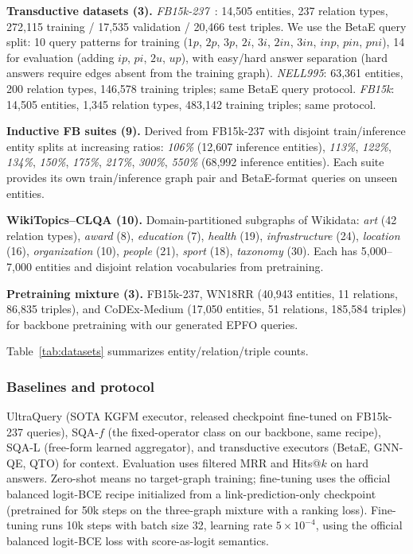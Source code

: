 \documentclass[journal]{IEEEtran}
\begin{document}
\textbf{Transductive datasets (3).}
\emph{FB15k-237}~\cite{ren2020betae}: 14{,}505 entities, 237 relation
types, 272{,}115 training / 17{,}535 validation / 20{,}466 test triples.
We use the BetaE query split: 10 query patterns for training ($1p$, $2p$,
$3p$, $2i$, $3i$, $2in$, $3in$, $inp$, $pin$, $pni$), 14 for evaluation
(adding $ip$, $pi$, $2u$, $up$), with easy/hard answer separation (hard
answers require edges absent from the training graph).
\emph{NELL995}: 63{,}361 entities, 200 relation types, 146{,}578
training triples; same BetaE query protocol.
\emph{FB15k}: 14{,}505 entities, 1{,}345 relation types, 483{,}142
training triples; same protocol.

\textbf{Inductive FB suites (9).} Derived from FB15k-237 with disjoint
train/inference entity splits at increasing ratios: \emph{106\%}
(12{,}607 inference entities), \emph{113\%}, \emph{122\%}, \emph{134\%},
\emph{150\%}, \emph{175\%}, \emph{217\%}, \emph{300\%}, \emph{550\%}
(68{,}992 inference entities). Each suite provides its own
train/inference graph pair and BetaE-format queries on unseen entities.

\textbf{WikiTopics--CLQA (10).} Domain-partitioned subgraphs of
Wikidata: \emph{art} (42 relation types), \emph{award} (8),
\emph{education} (7), \emph{health} (19), \emph{infrastructure} (24),
\emph{location} (16), \emph{organization} (10), \emph{people} (21),
\emph{sport} (18), \emph{taxonomy} (30). Each has 5{,}000--7{,}000
entities and disjoint relation vocabularies from pretraining.

\textbf{Pretraining mixture (3).} FB15k-237, WN18RR (40{,}943 entities,
11 relations, 86{,}835 triples), and CoDEx-Medium (17{,}050 entities,
51 relations, 185{,}584 triples) for backbone pretraining with our
generated EPFO queries.

Table~\ref{tab:datasets} summarizes entity/relation/triple counts.

\subsubsection{Baselines and protocol}
UltraQuery (SOTA KGFM executor, released checkpoint fine-tuned on
FB15k-237 queries), SQA-$f$ (the fixed-operator class on our backbone,
same recipe), SQA-L (free-form learned aggregator), and transductive
executors (BetaE, GNN-QE, QTO) for context. Evaluation uses filtered
MRR and Hits@$k$ on hard answers. Zero-shot means no target-graph
training; fine-tuning uses the official balanced logit-BCE recipe
initialized from a link-prediction-only checkpoint
(pretrained for 50k steps on the three-graph mixture with a ranking
loss). Fine-tuning runs 10k steps with batch size 32, learning rate
$5{\times}10^{-4}$, using the official balanced logit-BCE loss with
score-as-logit semantics.
\end{document}
